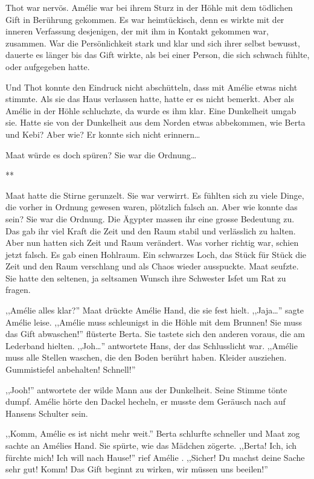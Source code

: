 \documentclass[11pt,titlepage,a5paper]{book}
\newcommand{\sterne}{\par{\centering ***\par}}
\newcommand{\am}{Amélie }
\begin{document}
Thot war nervös. \am war bei ihrem Sturz in der Höhle mit dem tödlichen Gift in Berührung gekommen. Es war heimtückisch, denn es wirkte mit der inneren Verfassung desjenigen, der mit ihm in Kontakt gekommen war, zusammen. War die Persönlichkeit stark und klar und sich ihrer selbst bewusst, dauerte es länger bis das Gift wirkte, als bei einer Person, die sich  schwach fühlte, oder aufgegeben hatte.

Und Thot konnte den Eindruck nicht abschütteln, dass mit \am etwas nicht stimmte. Als sie das Haus verlassen hatte, hatte er es nicht bemerkt. Aber als \am in der Höhle schluchzte, da wurde es ihm klar. Eine Dunkelheit umgab sie. Hatte sie von der Dunkelheit aus dem Norden etwas abbekommen, wie Berta und Kebi? Aber wie? Er konnte sich nicht erinnern\dots 

Maat würde es doch spüren? Sie war die Ordnung\dots

\sterne

Maat hatte die Stirne gerunzelt. Sie war verwirrt. Es fühlten sich zu viele Dinge, die vorher in Ordnung gewesen waren, plötzlich falsch an. Aber wie konnte das sein? Sie war die Ordnung. Die Ägypter massen ihr eine grosse Bedeutung zu. Das gab ihr viel Kraft die Zeit und den Raum stabil und verlässlich zu halten. Aber nun hatten sich Zeit und Raum verändert. Was vorher richtig war, schien jetzt falsch. Es gab einen Hohlraum. Ein schwarzes Loch, das Stück für Stück die Zeit und den Raum verschlang und als Chaos wieder ausspuckte. Maat seufzte. Sie hatte den seltenen, ja seltsamen Wunsch ihre Schwester Isfet um Rat zu fragen.

,,\am alles klar?'' Maat drückte \am Hand, die sie fest hielt. ,,Jaja\dots '' sagte \am leise. ,,\am muss schleunigst in die Höhle mit dem Brunnen! Sie muss das Gift abwaschen!'' flüsterte Berta. Sie tastete sich den anderen voraus, die am Lederband hielten. ,,Joh\dots '' antwortete Hans, der das Schlusslicht war. ,,\am muss alle Stellen waschen, die den Boden berührt haben. Kleider ausziehen. Gummistiefel anbehalten! Schnell!''

,,Jooh!'' antwortete der wilde Mann aus der Dunkelheit. Seine Stimme tönte dumpf. \am hörte den Dackel hecheln, er musste dem Geräusch nach auf Hansens Schulter sein.

,,Komm, \am es ist nicht mehr weit.''  Berta schlurfte schneller und Maat zog sachte an Amélies Hand. Sie spürte, wie das Mädchen zögerte. ,,Berta! Ich, ich fürchte mich! Ich will nach Hause!'' rief \am. ,,Sicher! Du machst deine Sache sehr gut! Komm! Das Gift beginnt zu wirken, wir müssen uns beeilen!''
\end{document}
